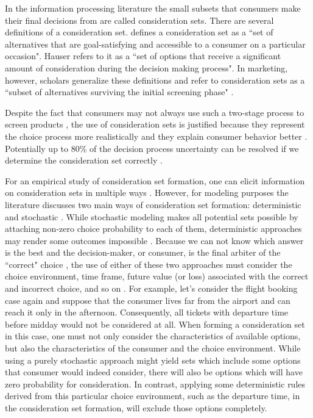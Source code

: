 \documentclass[a4paper,12pt]{article}
\newcommand{\citeyearonly}[1]{\citeyearpar{#1}}
\begin{document}
In the information processing literature the small subsets that consumers make their final decisions from are called consideration sets. There are several definitions of a consideration set. \citep{shocker1991consideration} defines a consideration set as a ``set of alternatives that are goal-satisfying and accessible to a consumer on a particular occasion". Hauser \citeyearonly{hauser1990evaluation} refers to it as a ``set of options that receive a significant amount of consideration during the decision making process". In marketing, however, scholars generalize these definitions and  refer to consideration sets as a ``subset of alternatives surviving the initial screening phase" \citep{haubl2000consumer}. 

Despite the fact that consumers may not always use such a two-stage process to screen products \citep{hauser2009non}, the use of consideration sets is justified because they represent the choice process more realistically and they explain consumer behavior better \citep{horowitz1995role}. Potentially up to 80\% of the decision process uncertainty can be resolved if we determine the consideration set correctly \citep{hauser1978testing}. 

For an empirical study of consideration set formation, one can elicit information on consideration sets in multiple ways \citep{ding2011unstructured,gaskin2007two,yee2007greedoid}. However, for modeling purposes the literature discusses two main ways of consideration set formation: deterministic \citep{coombs1951mathematical} and stochastic \citep{mcfadden1973conditional, urban1984testing}. While stochastic modeling makes all potential sets possible by attaching non-zero choice probability to each of them, deterministic approaches may render some outcomes impossible \citep{aribarg2018advancing}. Because we can not know which answer is the best and the decision-maker, or consumer, is the final arbiter of the ``correct" choice \citep{hauser2014consideration}, the use of either of these two approaches must consider the choice environment, time frame, future value (or loss) associated with the correct and incorrect choice, and so on \citep{punj2009information}. For example, let's consider the flight booking case again and suppose that the consumer lives far from the airport and can reach it only in the afternoon. Consequently, all tickets with departure time before midday would not be considered at all. When forming a consideration set in this case, one must not only consider the characteristics of available options, but also the characteristics of the consumer and the choice environment. While using a purely stochastic approach might yield sets which include some options that consumer would indeed consider, there will also be options which will have zero probability for consideration. In contrast, applying some deterministic rules derived from this particular choice environment, such as the departure time, in the consideration set formation, will exclude those options completely.
\end{document}
